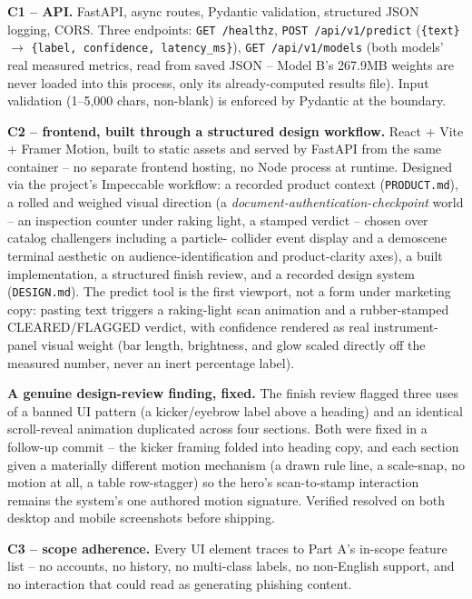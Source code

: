 \documentclass[11pt,a4paper]{article}
\begin{document}
\textbf{C1 -- API.} FastAPI, async routes, Pydantic validation, structured JSON logging,
CORS. Three endpoints: \texttt{GET /healthz}, \texttt{POST /api/v1/predict}
(\texttt{\{text\}} $\to$ \texttt{\{label, confidence, latency\_ms\}}), \texttt{GET
/api/v1/models} (both models' real measured metrics, read from saved JSON -- Model B's
267.9MB weights are never loaded into this process, only its already-computed results file).
Input validation (1--5{,}000 chars, non-blank) is enforced by Pydantic at the boundary.

\textbf{C2 -- frontend, built through a structured design workflow.} React + Vite + Framer
Motion, built to static assets and served by FastAPI from the same container -- no separate
frontend hosting, no Node process at runtime. Designed via the project's Impeccable
workflow: a recorded product context (\texttt{PRODUCT.md}), a rolled and weighed visual
direction (a \emph{document-authentication-checkpoint} world -- an inspection counter under
raking light, a stamped verdict -- chosen over catalog challengers including a particle-
collider event display and a demoscene terminal aesthetic on audience-identification and
product-clarity axes), a built implementation, a structured finish review, and a recorded
design system (\texttt{DESIGN.md}). The predict tool is the first viewport, not a form under
marketing copy: pasting text triggers a raking-light scan animation and a rubber-stamped
CLEARED/FLAGGED verdict, with confidence rendered as real instrument-panel visual weight
(bar length, brightness, and glow scaled directly off the measured number, never an inert
percentage label).

\textbf{A genuine design-review finding, fixed.} The finish review flagged three uses of a
banned UI pattern (a kicker/eyebrow label above a heading) and an identical scroll-reveal
animation duplicated across four sections. Both were fixed in a follow-up commit -- the
kicker framing folded into heading copy, and each section given a materially different
motion mechanism (a drawn rule line, a scale-snap, no motion at all, a table row-stagger) so
the hero's scan-to-stamp interaction remains the system's one authored motion signature.
Verified resolved on both desktop and mobile screenshots before shipping.

\textbf{C3 -- scope adherence.} Every UI element traces to Part A's in-scope feature list --
no accounts, no history, no multi-class labels, no non-English support, and no interaction
that could read as generating phishing content.
\end{document}
